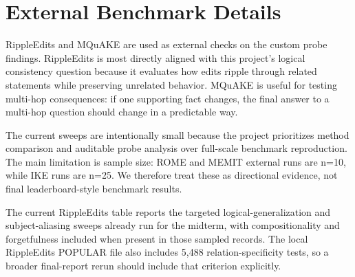 \documentclass[11pt]{article}
\begin{document}
\section{External Benchmark Details}

RippleEdits and MQuAKE are used as external checks on the custom probe findings. RippleEdits is most directly aligned with this project's logical consistency question because it evaluates how edits ripple through related statements while preserving unrelated behavior. MQuAKE is useful for testing multi-hop consequences: if one supporting fact changes, the final answer to a multi-hop question should change in a predictable way.

The current sweeps are intentionally small because the project prioritizes method comparison and auditable probe analysis over full-scale benchmark reproduction. The main limitation is sample size: ROME and MEMIT external runs are n=10, while IKE runs are n=25. We therefore treat these as directional evidence, not final leaderboard-style benchmark results.

The current RippleEdits table reports the targeted logical-generalization and subject-aliasing sweeps already run for the midterm, with compositionality and forgetfulness included when present in those sampled records. The local RippleEdits POPULAR file also includes 5,488 relation-specificity tests, so a broader final-report rerun should include that criterion explicitly.
\end{document}
